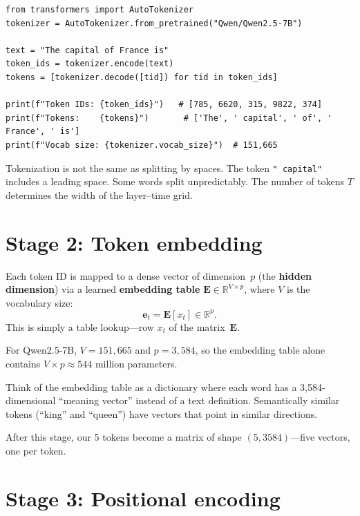 \documentclass[11pt, twoside, openright]{memoir}
\begin{document}
\begin{lstlisting}[caption={Tokenization in Python}]
from transformers import AutoTokenizer
tokenizer = AutoTokenizer.from_pretrained("Qwen/Qwen2.5-7B")

text = "The capital of France is"
token_ids = tokenizer.encode(text)
tokens = [tokenizer.decode([tid]) for tid in token_ids]

print(f"Token IDs: {token_ids}")   # [785, 6620, 315, 9822, 374]
print(f"Tokens:    {tokens}")       # ['The', ' capital', ' of', ' France', ' is']
print(f"Vocab size: {tokenizer.vocab_size}")  # 151,665
\end{lstlisting}

\begin{pitfall}
Tokenization is not the same as splitting by spaces.  The token
\texttt{" capital"} includes a leading space.  Some words split
unpredictably.  The number of tokens $T$ determines the width of the
layer--time grid.
\end{pitfall}

\section{Stage 2: Token embedding}

Each token ID is mapped to a dense vector of dimension~$p$ (the
\textbf{hidden dimension}) via a learned \textbf{embedding table}
$\mathbf{E} \in \mathbb{R}^{V \times p}$, where $V$ is the vocabulary size:
\[
  \mathbf{e}_t = \mathbf{E}[x_t] \in \mathbb{R}^p.
\]
This is simply a table lookup---row $x_t$ of the matrix~$\mathbf{E}$.

For Qwen2.5-7B, $V = 151{,}665$ and $p = 3{,}584$, so the embedding table
alone contains $V \times p \approx 544$ million parameters.

\begin{analogy}
Think of the embedding table as a dictionary where each word has a
3{,}584-dimensional ``meaning vector'' instead of a text definition.
Semantically similar tokens (``king'' and ``queen'') have vectors that
point in similar directions.
\end{analogy}

After this stage, our 5 tokens become a matrix of shape $(5, 3584)$---five
vectors, one per token.

\section{Stage 3: Positional encoding}
\end{document}
